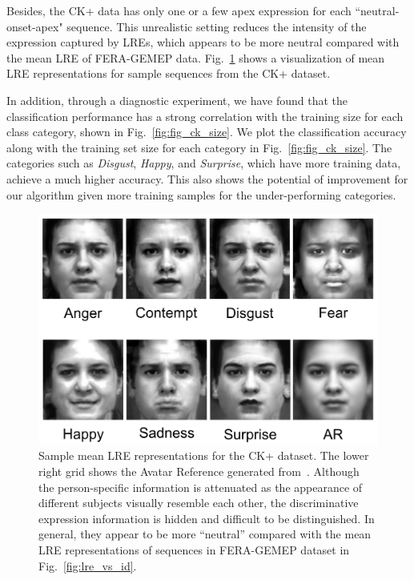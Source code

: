 \documentclass[journal]{IEEEtran}
\begin{document}
Besides, the CK+ data has only one or a few apex expression for each ``neutral-onset-apex" sequence. This unrealistic setting reduces the intensity of the expression captured by LREs, which appears to be more neutral compared with the mean LRE of FERA-GEMEP data. Fig.~\ref{fig:ck_eai} shows a visualization of mean LRE representations for sample sequences from the CK+ dataset. 

In addition, through a diagnostic experiment, we have found that the classification performance has a strong correlation with the training size for each class category, shown in Fig.~\ref{fig:fig_ck_size}. We plot the classification accuracy along with the training set size for each category in Fig.~\ref{fig:fig_ck_size}. The categories such as \textit{Disgust}, \textit{Happy}, and \textit{Surprise}, which have more training data, achieve a much higher accuracy. This also shows the potential of improvement for our algorithm given more training samples for the under-performing categories. 

\begin{figure}[htbp]
	\centering
		\includegraphics[width=.7\columnwidth]{pics/ck_eai.png}
	\caption{Sample mean LRE representations for the CK+ dataset. The lower right grid shows the Avatar Reference generated from~\cite{Yang_SMCB12}. Although the person-specific information is attenuated as the appearance of different subjects visually resemble each other, the discriminative expression information is hidden and difficult to be distinguished. In general, they appear to be more ``neutral'' compared with the mean LRE representations of sequences in FERA-GEMEP dataset in Fig.~\ref{fig:lre_vs_id}.}
	\label{fig:ck_eai}
\end{figure}
\end{document}
